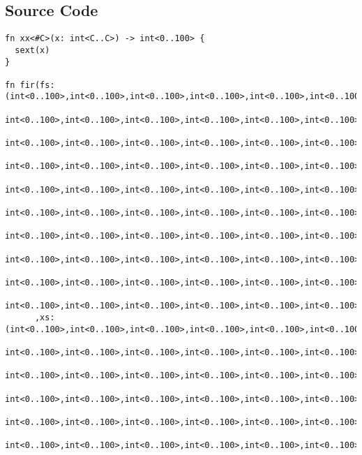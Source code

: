 \subsection{Source Code}
\label{source:FIR}
\begin{verbatim}
fn xx<#C>(x: int<C..C>) -> int<0..100> {
  sext(x)
}

fn fir(fs: (int<0..100>,int<0..100>,int<0..100>,int<0..100>,int<0..100>,int<0..100>,int<0..100>,int<0..100>,int<0..100>,int<0..100>,
            int<0..100>,int<0..100>,int<0..100>,int<0..100>,int<0..100>,int<0..100>,int<0..100>,int<0..100>,int<0..100>,int<0..100>,
            int<0..100>,int<0..100>,int<0..100>,int<0..100>,int<0..100>,int<0..100>,int<0..100>,int<0..100>,int<0..100>,int<0..100>,
            int<0..100>,int<0..100>,int<0..100>,int<0..100>,int<0..100>,int<0..100>,int<0..100>,int<0..100>,int<0..100>,int<0..100>,
            int<0..100>,int<0..100>,int<0..100>,int<0..100>,int<0..100>,int<0..100>,int<0..100>,int<0..100>,int<0..100>,int<0..100>,
            int<0..100>,int<0..100>,int<0..100>,int<0..100>,int<0..100>,int<0..100>,int<0..100>,int<0..100>,int<0..100>,int<0..100>,
            int<0..100>,int<0..100>,int<0..100>,int<0..100>,int<0..100>,int<0..100>,int<0..100>,int<0..100>,int<0..100>,int<0..100>,
            int<0..100>,int<0..100>,int<0..100>,int<0..100>,int<0..100>,int<0..100>,int<0..100>,int<0..100>,int<0..100>,int<0..100>,
            int<0..100>,int<0..100>,int<0..100>,int<0..100>,int<0..100>,int<0..100>,int<0..100>,int<0..100>,int<0..100>,int<0..100>,
            int<0..100>,int<0..100>,int<0..100>,int<0..100>,int<0..100>,int<0..100>,int<0..100>,int<0..100>,int<0..100>,int<0..100>)
      ,xs: (int<0..100>,int<0..100>,int<0..100>,int<0..100>,int<0..100>,int<0..100>,int<0..100>,int<0..100>,int<0..100>,int<0..100>,
            int<0..100>,int<0..100>,int<0..100>,int<0..100>,int<0..100>,int<0..100>,int<0..100>,int<0..100>,int<0..100>,int<0..100>,
            int<0..100>,int<0..100>,int<0..100>,int<0..100>,int<0..100>,int<0..100>,int<0..100>,int<0..100>,int<0..100>,int<0..100>,
            int<0..100>,int<0..100>,int<0..100>,int<0..100>,int<0..100>,int<0..100>,int<0..100>,int<0..100>,int<0..100>,int<0..100>,
            int<0..100>,int<0..100>,int<0..100>,int<0..100>,int<0..100>,int<0..100>,int<0..100>,int<0..100>,int<0..100>,int<0..100>,
            int<0..100>,int<0..100>,int<0..100>,int<0..100>,int<0..100>,int<0..100>,int<0..100>,int<0..100>,int<0..100>,int<0..100>,

\end{verbatim}
